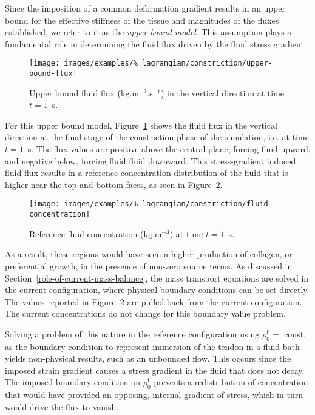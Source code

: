 Since the imposition of a common deformation gradient results in an
upper bound for the effective stiffness of the tissue and magnitudes
of the fluxes established, we refer to it as the {\em upper bound
  model}. This assumption plays a fundamental role in determining the
fluid flux driven by the fluid stress gradient.

\begin{figure}[!hpt]
  \centering
  \texttt{[image: images/examples/\%
    lagrangian/constriction/upper-bound-flux]}
  \caption{Upper bound fluid flux (kg.m$^{-2}$.s$^{-1}$) in
    the vertical direction at time $t=1$~s.}
  \label{eg2flux}
\end{figure}

\noindent For this upper bound model, Figure~\ref{eg2flux} shows the
fluid flux in the vertical direction at the final stage of the
constriction phase of the simulation, i.e. at time $t=1$~s. The flux
values are positive above the central plane, forcing fluid upward, and
negative below, forcing fluid fluid downward. This stress-gradient
induced fluid flux results in a reference concentration distribution
of the fluid that is higher near the top and bottom faces, as seen in
Figure~\ref{eg2conc}.

\begin{figure}[!hpt]
  \centering
  \texttt{[image: images/examples/\%
    lagrangian/constriction/fluid-concentration]}
  \caption{Reference fluid concentration (kg.m$^{-3}$) at time
    $t=1$~s.}
  \label{eg2conc}
\end{figure}

As a result, these regions would have seen a higher production of
collagen, or preferential growth, in the presence of non-zero source
terms. As discussed in Section~\ref{role-of-current-mass-balance}, the
mass transport equations are solved in the current configuration,
where physical boundary conditions can be set directly. The values
reported in Figure~\ref{eg2conc} are pulled-back from the current
configuration. The current concentrations do not change for this
boundary value problem.

Solving a problem of this nature in the reference configuration using
$\rho_0^\mathrm{f} = $ const. as the boundary condition to represent
immersion of the tendon in a fluid bath yields non-physical results,
such as an unbounded flow. This occurs since the imposed strain
gradient causes a stress gradient in the fluid that does not
decay. The imposed boundary condition on $\rho_0^\mathrm{f}$ prevents
a redistribution of concentration that would have provided an
opposing, internal gradient of stress, which in turn would drive the
flux to vanish.


